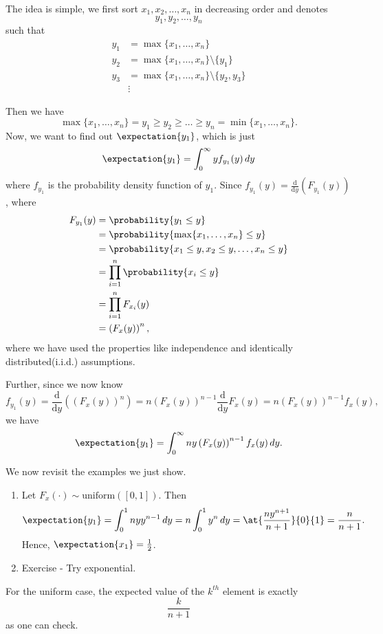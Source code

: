 \hr

The idea is simple, we first sort \(x_1, x_2, \ldots , x_n\) in decreasing order and denotes
\[
	y_1, y_2, \ldots , y_{n}
\]
such that
\[
	\begin{split}
		y_1 &= \max\{x_1, \ldots , x_n\}\\
		y_2 &= \max\{x_1, \ldots , x_n\}\setminus \{y_1\}\\
		y_3 &= \max\{x_1, \ldots , x_n\}\setminus \{y_2, y_3\}\\
		&\vdots
	\end{split}
\]

Then we have
\[
	\max\{x_1, \ldots , x_n\} = y_1\geq y_2\geq \ldots \geq y_n = \min\{x_1, \ldots , x_{n}\}.
\]
Now, we want to find out \(\expectation{y_1} \), which is just
\[
	\expectation{y_1} = \int_0^{\infty } y f_{y_1}(y)\,dy
\]
where \(f_{y_1}\) is the probability density function of \(y_1\). Since \(f_{y_1}(y) = \frac{\mathrm{d}}{\mathrm{d}y} \left(F_{y_1}(y)\right)\),
where
\[
	\begin{split}
		F_{y_1}(y) &= \probability{y_1\leq y}\\
		&= \probability{\max\{x_1, \ldots , x_{n}\}\leq y}\\
		&= \probability{x_1\leq y, x_2\leq y, \ldots , x_n\leq y}\\
		&= \prod\limits_{i=1}^{n} \probability{x_{i}\leq y}\\
		&= \prod\limits_{i=1}^{n} F_{x_{i}}(y)\\
		&= \left(F_x(y)\right)^n,
	\end{split}
\]
where we have used the properties like independence and identically distributed(i.i.d.) assumptions.

Further, since we now know
\[
	f_{y_1}(y) = \frac{\mathrm{d}}{\mathrm{d}y}\left(\left(F_x(y)\right)^n\right) = n \left(F_x(y)\right)^{n-1} \frac{\mathrm{d}}{\mathrm{d}y} F_x(y) = n\left(F_{x}(y)\right)^{n-1}f_x(y),
\]
we have
\[
	\expectation{y_1} = \int_0^{\infty }n y \left(F_{x}(y)\right)^{n-1} f_x(y)\,dy.
\]

\begin{eg}
	We now revisit the examples we just show.
	\begin{enumerate}
		\item Let \(F_{x}(\cdot)\sim \mathrm{uniform}([0,1]) \). Then
		      \[
			      \expectation{y_1} = \int_0^1 n y y^{n-1}\,dy = n\int_0^1 y^n \,dy = \at{\frac{ny^{n+1}}{n+1}}{0}{1} = \frac{n}{n+1} .
		      \]
		      Hence, \(\expectation{x_1}= \frac{1}{2} \).
		\item Exercise - Try exponential.
	\end{enumerate}
\end{eg}
\begin{remark}
	For the uniform case, the expected value of the \(k^{th}\) element is exactly
	\[
		\frac{k}{n+1}
	\]
	as one can check.
\end{remark}


